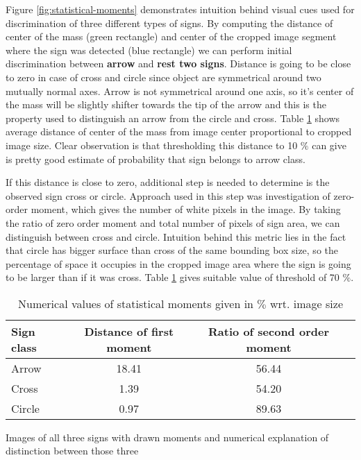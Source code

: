 Figure \ref{fig:statistical-moments} demonstrates intuition behind visual cues used for discrimination of three different types of signs. By computing the distance of center of the mass (green rectangle) and center of the cropped image segment where the sign was detected (blue rectangle) we can perform initial discrimination between \textbf{arrow} and \textbf{rest two signs}. Distance is going to be close to zero in case of cross and circle since object are symmetrical around two mutually normal axes. Arrow is not symmetrical around one axis, so it's center of the mass will be slightly shifter towards the tip of the arrow and this is the property used to distinguish an arrow from the circle and cross.
Table \ref{tab:moments} shows average distance of center of the mass from image center proportional to cropped image size. Clear observation is that thresholding this distance to 10 $\%$ can give is pretty good estimate of probability that sign belongs to arrow class.

If this distance is close to zero, additional step is needed to determine is the observed sign cross or circle. Approach used in this step was investigation of zero-order moment, which gives the number of white pixels in the image. By taking the ratio of zero order moment and total number of pixels of sign area, we can distinguish between cross and circle. Intuition behind this metric lies in the fact that circle has bigger surface than cross of the same bounding box size, so the percentage of space it occupies in the cropped image area where the sign is going to be larger than if it was cross. Table \ref{tab:moments} gives suitable value of threshold of 70 $\%$.

\begin{table}[th!]
\centering
\begin{tabular}{l*{2}{c}r}
	Sign class			& Distance of first moment & Ratio of second order moment  \\
	\hline
	Arrow 				& 18.41 & 56.44  \\
	Cross            	& 1.39 & 54.20  \\
	Circle           	& 0.97 & 89.63  \\
\end{tabular}
\caption{Numerical values of statistical moments given in $\%$ wrt. image size}
\label{tab:moments}
\end{table}

Images of all three signs with drawn moments and numerical explanation of distinction between those three

